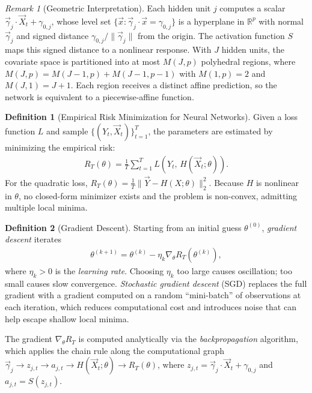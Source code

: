 \documentclass[11pt]{article}
\theoremstyle{definition}
\newtheorem{definition}{Definition}[section]
\theoremstyle{plain}
\theoremstyle{remark}
\newtheorem{remark}{Remark}[section]
\begin{document}
\begin{remark}[Geometric Interpretation]
    Each hidden unit $j$ computes a scalar $\vec{\gamma}_j\cdot\vec{X}_t + \gamma_{0,j}$, whose level set $\{\vec{x} : \vec{\gamma}_j\cdot\vec{x} = \gamma_{0,j}\}$ is a hyperplane in $\mathbb{R}^p$ with normal $\vec{\gamma}_j$ and signed distance $\gamma_{0,j}/\|\vec{\gamma}_j\|$ from the origin. The activation function $S$ maps this signed distance to a nonlinear response. With $J$ hidden units, the covariate space is partitioned into at most $M(J,p)$ polyhedral regions, where $M(J,p) = M(J-1,p)+M(J-1,p-1)$ with $M(1,p)=2$ and $M(J,1)=J+1$. Each region receives a distinct affine prediction, so the network is equivalent to a piecewise-affine function.
\end{remark}


\begin{definition}[Empirical Risk Minimization for Neural Networks]
    Given a loss function $L$ and sample $\{(Y_t, \vec{X}_t)\}_{t=1}^T$, the parameters are estimated by minimizing the empirical risk:
    \begin{align}
        R_T(\theta) = \frac{1}{T}\sum_{t=1}^T L\!\left(Y_t,\, H(\vec{X}_t;\theta)\right).
    \end{align}
    For the quadratic loss, $R_T(\theta) = \frac{1}{T}\|\vec{Y} - H(X;\theta)\|_2^2$. Because $H$ is nonlinear in $\theta$, no closed-form minimizer exists and the problem is non-convex, admitting multiple local minima.
\end{definition}

\begin{definition}[Gradient Descent]
    Starting from an initial guess $\theta^{(0)}$, \textit{gradient descent} iterates
    \begin{align}
        \theta^{(k+1)} = \theta^{(k)} - \eta_k \nabla_\theta R_T\!\left(\theta^{(k)}\right),
    \end{align}
    where $\eta_k > 0$ is the \emph{learning rate}. Choosing $\eta_k$ too large causes oscillation; too small causes slow convergence. \emph{Stochastic gradient descent} (SGD) replaces the full gradient with a gradient computed on a random ``mini-batch'' of observations at each iteration, which reduces computational cost and introduces noise that can help escape shallow local minima.
\end{definition}

The gradient $\nabla_\theta R_T$ is computed analytically via the \emph{backpropagation} algorithm, which applies the chain rule along the computational graph $\vec{\gamma}_j \to z_{j,t} \to a_{j,t} \to H(\vec{X}_t;\theta) \to R_T(\theta)$, where $z_{j,t} = \vec{\gamma}_j\cdot\vec{X}_t + \gamma_{0,j}$ and $a_{j,t} = S(z_{j,t})$.
\end{document}
